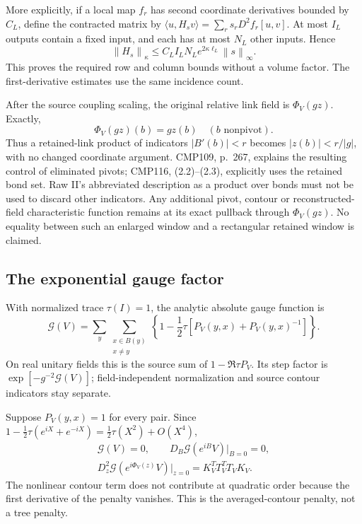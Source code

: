 \documentclass[11pt]{article}
\theoremstyle{remark}
\newcommand{\norm}[1]{\left\|#1\right\|}
\begin{document}
More explicitly, if a local map $f_r$ has second coordinate
derivatives bounded by $C_L$, define the contracted matrix by
$\langle u,H_sv\rangle=\sum_rs_rD^2f_r[u,v]$. At most $I_L$
outputs contain a fixed input, and each has at most $N_L$
other inputs. Hence
\begin{equation}\label{pc-contracted-tensor}
 \norm{H_s}_\kappa\le
 C_LI_LN_Le^{2\kappa\ell_L}\norm s_\infty.
\end{equation}
This proves the required row and column bounds without a volume
factor. The first-derivative estimates use the same incidence
count.

After the source coupling scaling, the original relative link
field is $\Phi_V(gz)$. Exactly,
\begin{equation}\label{pc-cutoff-identity}
 \Phi_V(gz)(b)=gz(b)\quad(b\text{ nonpivot}).
\end{equation}
Thus a retained-link product of indicators $|B'(b)|<r$ becomes
$|z(b)|<r/|g|$, with no changed coordinate argument. CMP109,
p.~267, explains the resulting control of eliminated pivots;
CMP116, (2.2)--(2.3), explicitly uses the retained bond set.
Raw II's abbreviated description as a product over bonds must
not be used to discard other indicators. Any additional pivot,
contour or reconstructed-field characteristic function remains
at its exact pullback through $\Phi_V(gz)$. No equality between
such an enlarged window and a rectangular retained window is
claimed.

\subsection{The exponential gauge factor}
\label{pc-gauge-section}

With normalized trace $\tau(I)=1$, the analytic absolute gauge
function is
\begin{equation}\label{pc-gauge-function}
 \mathcal G(V)=\sum_y\sum_{\substack{x\in B(y)\\x\ne y}}
 \left\{1-\frac12\tau[P_V(y,x)+P_V(y,x)^{-1}]\right\}.
\end{equation}
On real unitary fields this is the source sum of
$1-\Re\tau P_V$. Its step factor is
$\exp[-g^{-2}\mathcal G(V)]$; field-independent normalization
and source contour indicators stay separate.

Suppose $P_V(y,x)=1$ for every pair. Since
$1-\tfrac12\tau(e^{iX}+e^{-iX})=\tfrac12\tau(X^2)+O(X^4)$,
\begin{equation}\label{pc-gauge-hessian}
 \begin{gathered}
 \mathcal G(V)=0,\qquad
 D_B\mathcal G(e^{iB}V)|_{B=0}=0,\\
 D_z^2\mathcal G(e^{i\Phi_V(z)}V)|_{z=0}
      =K_V^TT_V^TT_VK_V.
 \end{gathered}
\end{equation}
The nonlinear contour term does not contribute at quadratic
order because the first derivative of the penalty vanishes.
This is the averaged-contour penalty, not a tree penalty.
\end{document}
